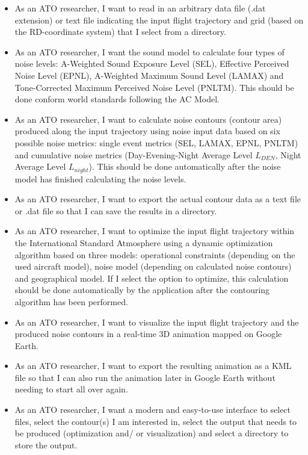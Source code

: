 ﻿\documentclass[a4paper,english,fleqn]{exam}
\begin{document}
\begin{itemize}
\item As an ATO researcher, I want to read in an arbitrary data file (.dat extension) or text file indicating the input flight trajectory and grid (based on the RD-coordinate system) that I select from a directory.
\item As an ATO researcher, I want the sound model to calculate four types of noise levels: A-Weighted Sound Exposure Level (SEL), Effective Perceived Noise Level (EPNL), A-Weighted Maximum Sound Level (LAMAX) and Tone-Corrected Maximum Perceived Noise Level (PNLTM). This should be done conform world standards following the AC Model.
\item As an ATO researcher, I want to calculate noise contours (contour area) produced along the input trajectory using noise input data based on six possible noise metrics: single event metrics (SEL, LAMAX, EPNL, PNLTM) and cumulative noise metrics (Day-Evening-Night Average Level $L_{DEN}$, Night Average Level $L_{night}$). This should be done automatically after the noise model has finished calculating the noise levels.
\item As an ATO researcher, I want to export the actual contour data as a text file or .dat file so that I can save the results in a directory. 
\item As an ATO researcher, I want to optimize the input flight trajectory within the International Standard Atmosphere using a dynamic optimization algorithm based on three models: operational constraints (depending on the used aircraft model), noise model (depending on calculated noise contours) and geographical model. If I select the option to optimize, this calculation should be done automatically by the application after the contouring algorithm has been performed.
\item As an ATO researcher, I want to visualize the input flight trajectory and the produced noise contours in a real-time 3D animation mapped on Google Earth.
\item As an ATO researcher, I want to export the resulting animation as a KML file so that I can also run the animation later in Google Earth without needing to start all over again.
\item As an ATO researcher, I want a modern and easy-to-use interface to select files, select the contour(s) I am interested in, select the output that needs to be produced (optimization and/ or visualization) and select a directory to store the output.
\end{itemize}
\end{document}

